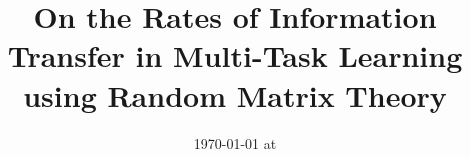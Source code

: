 \documentclass{article}
\begin{document}
\title{On the Rates of Information Transfer in Multi-Task Learning using Random Matrix Theory}
\date{}
\maketitle
\date{{\ddmmyyyydate\today} at \currenttime}




\end{document}
